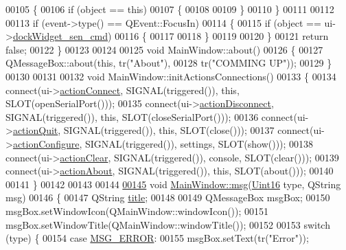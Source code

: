 \begin{DoxyCode}
00105     \{
00106         \textcolor{keywordflow}{if} (\textcolor{keywordtype}{object} == \textcolor{keyword}{this})
00107         \{
00108 
00109         \}
00110     \}
00111 
00112 
00113     \textcolor{keywordflow}{if} (event->type() == QEvent::FocusIn)
00114     \{
00115         \textcolor{keywordflow}{if} (\textcolor{keywordtype}{object} == ui->\hyperlink{a00080_a9eb86a5ee396766f0f4a65f2d2bd7688}{dockWidget\_sen\_cmd})
00116         \{
00117 
00118         \}
00119 
00120     \}
00121     \textcolor{keywordflow}{return} \textcolor{keyword}{false};
00122 \}
00123 
00124 
00125 \textcolor{keywordtype}{void} MainWindow::about()
00126 \{
00127     QMessageBox::about(\textcolor{keyword}{this}, tr(\textcolor{stringliteral}{"About"}),
00128                        tr(\textcolor{stringliteral}{"COMMING UP"}));
00129 \}
00130 
00131 
00132 \textcolor{keywordtype}{void} MainWindow::initActionsConnections()
00133 \{
00134     connect(ui->\hyperlink{a00080_aa0785566311fc48271690fb68b1d4c5f}{actionConnect}, SIGNAL(triggered()), \textcolor{keyword}{this}, SLOT(openSerialPort()));
00135     connect(ui->\hyperlink{a00080_a8a16b3aef75b279eaaa887152d2f746b}{actionDisconnect}, SIGNAL(triggered()), \textcolor{keyword}{this}, SLOT(closeSerialPort()));
00136     connect(ui->\hyperlink{a00080_a188c243f36a2dbc10e4e2a0ad94273b1}{actionQuit}, SIGNAL(triggered()), \textcolor{keyword}{this}, SLOT(close()));
00137     connect(ui->\hyperlink{a00080_a3860abde3cfd3f6170e28fddde73f11e}{actionConfigure}, SIGNAL(triggered()), settings, SLOT(show()));
00138     connect(ui->\hyperlink{a00080_ac8539dcd87955047877cb256aff60453}{actionClear}, SIGNAL(triggered()), console, SLOT(clear()));
00139     connect(ui->\hyperlink{a00080_abdf2b43167c2cd0d3405f90b8c30e934}{actionAbout}, SIGNAL(triggered()), \textcolor{keyword}{this}, SLOT(about()));
00140 
00141 \}
00142 
00143 
00144 
\hypertarget{a00109_source_l00145}{}\hyperlink{a00017_a6134b74dbfffbaf333e169bd09597b53}{00145} \textcolor{keywordtype}{void} \hyperlink{a00017_a6134b74dbfffbaf333e169bd09597b53}{MainWindow::msg}(\hyperlink{a00004_aae7407b021d43f7193a81a58cfb3e297}{Uint16} type, QString msg)
00146 \{
00147     QString \hyperlink{a00116_aec7f0fb0be1d3a0a946f0ded3a860d20}{title};
00148 
00149     QMessageBox msgBox;
00150     msgBox.setWindowIcon(QMainWindow::windowIcon());
00151     msgBox.setWindowTitle(QMainWindow::windowTitle());
00152 
00153     \textcolor{keywordflow}{switch} (type) \{
00154     \textcolor{keywordflow}{case} \hyperlink{a00090_aa8a990825a5a62c89d2fb8b08d8a1070}{MSG\_ERROR}:
00155         msgBox.setText(tr(\textcolor{stringliteral}{"Error"}));

\end{DoxyCode}
